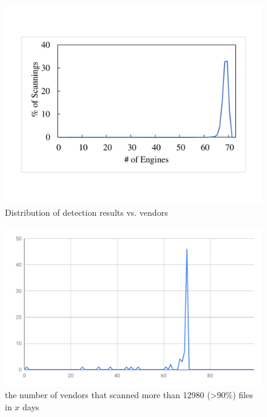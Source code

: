 \begin{figure}
\centering
\includegraphics[width=0.7\linewidth]{figure/vendor_submission_distribution}
\caption{Distribution of detection results vs. vendors}
\label{fig:dataset_submission_vendor_distri}
\end{figure}

\begin{figure}
\centering
\includegraphics[width=0.7\linewidth]{figure/dataset_no_vendors_scanned_moste_files_in_x_days}
\caption{the number of vendors that scanned more than 12980 (>90\%) files in $x$ days}
\label{fig:dataset_no_vendors_scanned_moste_files_in_x_days}
\end{figure}

